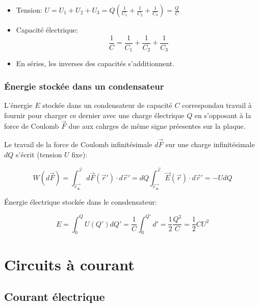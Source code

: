 \documentclass[
    11pt,
    a4paper,
    oneside,
    headinlcude, footinclude,
    twoside,
]{report}
\renewcommand{\vec}[1]{\overrightarrow{#1}}
\begin{document}
\begin{enumerate}
\begin{itemize}
            \item Tension: $U = U_1 + U_2 + U_3 = Q (\frac{1}{C_1} + \frac{1}{C_2} + \frac{1}{C_3})
                = \frac{Q}{C}$

            \item Capacité électrique:
                \begin{equation}
                    \label{eq:7.38}
                    \frac{1}{C} = \frac{1}{C_1} + \frac{1}{C_2} + \frac{1}{C_3}
                \end{equation}

            \item En séries, les inverses des capacités s'additionnent.
        \end{itemize}
\end{enumerate}

\subsection{Énergie stockée dans un condensateur}

L'énergie $E$ stockée dans un condensateur de capacité $C$ correspondau travail
à fournir pour charger ce dernier avec une charge électrique $Q$ en s'opposant
à la force de Coulomb $\vec F$ due aux cahrges de même signe préesentes sur la
plaque.

Le travail de la force de Coulomb infinitésimale $d\vec F$ sur une charge
infinitésimale $dQ$ s'écrit (tension $U$ fixe):

$$W(d\vec F) = \int^{\vec r}_{\vec{r_{\infty}}} d \vec F(\vec r') \cdot d\vec r'
= dQ \int_{\vec{r_{\infty}}}^{\vec r} \vec E(\vec r) \cdot d\vec r' =  - U dQ$$

Énergie électrique stockée dans le consdensateur:

\begin{equation}
    \label{eq:7.39}
    E = \int_0^Q U(Q')dQ' = \frac{1}{C} \int_0^{Q'} d' = \frac{1}{2} \frac{Q^2}{C}
    = \frac{1}{2} C U^2
\end{equation}

\chapter{Circuits à courant}
\label{cha:circuits_a_courant}

\section{Courant électrique}
\label{sec:courant_electrique}
\end{document}
